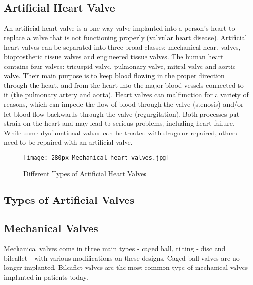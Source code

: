 \documentclass[12pt]{article}
\begin{document}
\begin{normalsize}

\section{Artificial Heart Valve}
An artificial heart valve is a one-way valve implanted into a person's heart to replace a valve that is not functioning properly (valvular heart disease). Artificial heart valves can be separated into three broad classes: mechanical heart valves, bioprosthetic tissue valves and engineered tissue valves.
\linebreak
\linebreak
The human heart contains four valves: tricuspid valve, pulmonary valve, mitral valve and aortic valve. Their main purpose is to keep blood flowing in the proper direction through the heart, and from the heart into the major blood vessels connected to it (the pulmonary artery and aorta). Heart valves can malfunction for a variety of reasons, which can impede the flow of blood through the valve (stenosis) and/or let blood flow backwards through the valve (regurgitation). Both processes put strain on the heart and may lead to serious problems, including heart failure. While some dysfunctional valves can be treated with drugs or repaired, others need to be repaired with an artificial valve.
\linebreak
\linebreak
\begin{figure}[h]
\centering
\texttt{[image: 280px-Mechanical\_heart\_valves.jpg]}
\caption{Different Types of Artificial Heart Valves}

\end{figure}


\begin{large}
\subsection{Types of Artificial Valves}
\end{large}

\raggedright
\subsection{Mechanical Valves}
Mechanical valves come in three main types - caged ball, tilting - disc and bileaflet - with various modifications on these designs. Caged ball valves are no longer implanted. Bileaflet valves are the most common type of mechanical valves implanted in patients today.


\end{normalsize}
\end{document}
